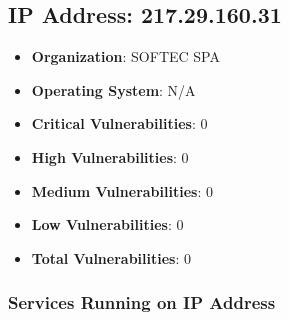 \documentclass{article}
\begin{document}
\clearpage



\subsection*{IP Address: 217.29.160.31}

\begin{itemize}
    \item \textbf{Organization}: SOFTEC SPA
    \item \textbf{Operating System}:  N/A 
    \item \textbf{Critical Vulnerabilities}: 0
    \item \textbf{High Vulnerabilities}: 0
    \item \textbf{Medium Vulnerabilities}: 0
    \item \textbf{Low Vulnerabilities}: 0
    \item \textbf{Total Vulnerabilities}: 0
\end{itemize}

\subsubsection*{Services Running on IP Address}
\end{document}

